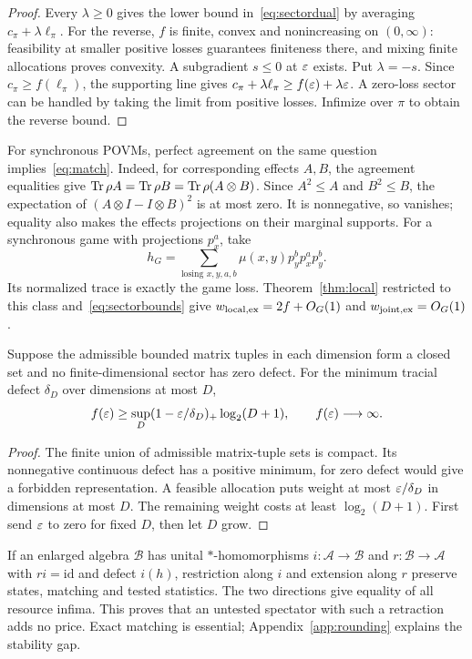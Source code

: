 \begin{proof}
Every $\lambda\ge0$ gives the lower bound in~\eqref{eq:sectordual} by averaging $c_\pi+\lambda\ell_\pi$. For the reverse, $f$ is finite, convex and nonincreasing on $(0,\infty)$: feasibility at smaller positive losses guarantees finiteness there, and mixing finite allocations proves convexity. A subgradient $s\le0$ at $\varepsilon$ exists. Put $\lambda=-s$. Since $c_\pi\ge f(\ell_\pi)$, the supporting line gives $c_\pi+\lambda\ell_\pi\ge f(\varepsilon)+\lambda\varepsilon$. A zero-loss sector can be handled by taking the limit from positive losses. Infimize over $\pi$ to obtain the reverse bound.
\end{proof}

For synchronous POVMs, perfect agreement on the same question implies~\eqref{eq:match}. Indeed, for corresponding effects $A,B$, the agreement equalities give $\operatorname{Tr}\rho A=\operatorname{Tr}\rho B=\operatorname{Tr}\rho(A\otimes B)$. Since $A^2\le A$ and $B^2\le B$, the expectation of $(A\otimes I-I\otimes B)^2$ is at most zero. It is nonnegative, so vanishes; equality also makes the effects projections on their marginal supports. For a synchronous game with projections $p_x^a$, take
\[
 h_G=\sum_{\text{losing }x,y,a,b}\mu(x,y)p_y^bp_x^ap_y^b.
\]
Its normalized trace is exactly the game loss. Theorem~\ref{thm:local} restricted to this class and~\eqref{eq:sectorbounds} give $w_{\rm local,ex}=2f+O_G(1)$ and $w_{\rm joint,ex}=O_G(1)$.

\begin{corollary}\label{cor:compact}
Suppose the admissible bounded matrix tuples in each dimension form a closed set and no finite-dimensional sector has zero defect. For the minimum tracial defect $\delta_D$ over dimensions at most $D$,
\[
 f(\varepsilon)\ge\sup_D(1-\varepsilon/\delta_D)_+\log_2(D+1),
 \qquad f(\varepsilon)\longrightarrow\infty.
\]
\end{corollary}
\begin{proof}
The finite union of admissible matrix-tuple sets is compact. Its nonnegative continuous defect has a positive minimum, for zero defect would give a forbidden representation. A feasible allocation puts weight at most $\varepsilon/\delta_D$ in dimensions at most $D$. The remaining weight costs at least $\log_2(D+1)$. First send $\varepsilon$ to zero for fixed $D$, then let $D$ grow.
\end{proof}

If an enlarged algebra $\mathcal B$ has unital $*$-homomorphisms $i:\mathcal A\to\mathcal B$ and $r:\mathcal B\to\mathcal A$ with $ri=\mathrm{id}$ and defect $i(h)$, restriction along $i$ and extension along $r$ preserve states, matching and tested statistics. The two directions give equality of all resource infima. This proves that an untested spectator with such a retraction adds no price. Exact matching is essential; Appendix~\ref{app:rounding} explains the stability gap.

